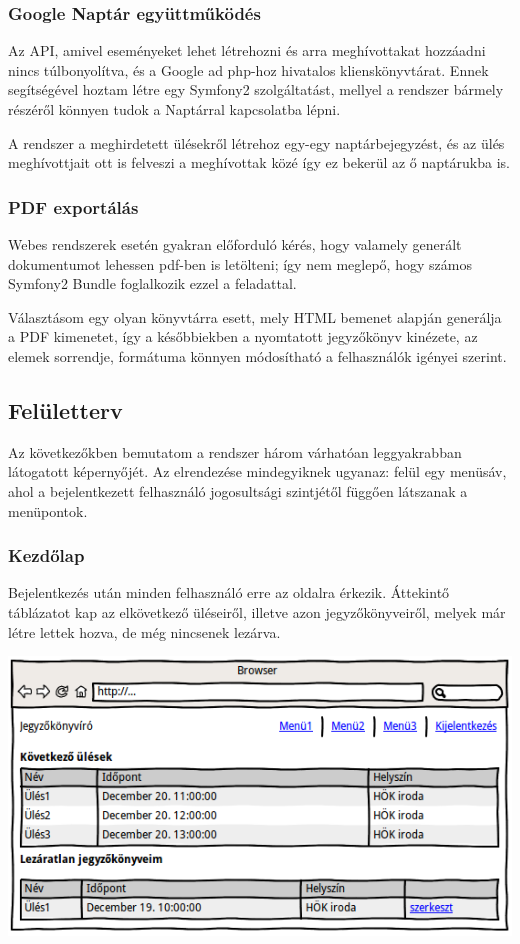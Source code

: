 \documentclass[a4paper,12pt,oneside]{report}
\begin{document}
\subsubsection{Google Naptár együttműködés}

Az API, amivel eseményeket lehet létrehozni és arra meghívottakat hozzáadni\cite{website:gcal_event_api} nincs túlbonyolítva, és a Google ad php-hoz hivatalos klienskönyvtárat\cite{website:google_api_client}. Ennek segítségével hoztam létre egy Symfony2 szolgáltatást, mellyel a rendszer bármely részéről könnyen tudok a Naptárral kapcsolatba lépni.

A rendszer a meghirdetett ülésekről létrehoz egy-egy naptárbejegyzést, és az ülés meghívottjait ott is felveszi a meghívottak közé \textendash{} így ez bekerül az ő naptárukba is.

\subsubsection{PDF exportálás}

Webes rendszerek esetén gyakran előforduló kérés, hogy valamely generált dokumentumot lehessen pdf-ben is letölteni; így nem meglepő, hogy számos Symfony2 Bundle foglalkozik ezzel a feladattal.

Választásom egy olyan könyvtárra esett, mely HTML bemenet alapján generálja a PDF kimenetet, így a későbbiekben a nyomtatott jegyzőkönyv kinézete, az elemek sorrendje, formátuma könnyen módosítható a felhasználók igényei szerint.

\subsection{Felületterv}

Az következőkben bemutatom a rendszer három várhatóan leggyakrabban látogatott képernyőjét. Az elrendezése mindegyiknek ugyanaz: felül egy menüsáv, ahol a bejelentkezett felhasználó jogosultsági szintjétől függően látszanak a menüpontok.

\subsubsection{Kezdőlap}

Bejelentkezés után minden felhasználó erre az oldalra érkezik. Áttekintő táblázatot kap az elkövetkező üléseiről, illetve azon jegyzőkönyveiről, melyek már létre lettek hozva, de még nincsenek lezárva.

\includegraphics[width=\textwidth]{wireframe-kezdolap}
\end{document}
